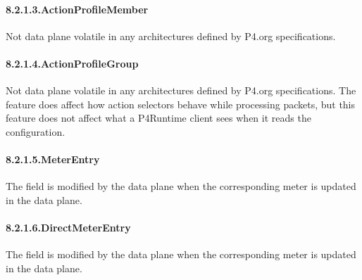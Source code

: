 \documentclass[11pt]{article}
\begin{document}
{%
\paragraph{8.2.1.3.\hspace*{0.5em}ActionProfileMember}\label{sec-actionprofilemember}%

\noindent{}Not data plane volatile in any architectures defined by P4.org
specifications.%

\paragraph{8.2.1.4.\hspace*{0.5em}ActionProfileGroup}\label{sec-actionprofilegroup}%

\noindent{}Not data plane volatile in any architectures defined by P4.org
specifications. The  feature does affect how action
selectors behave while processing packets, but this feature does not
affect what a P4Runtime client sees when it reads the configuration.%

\paragraph{8.2.1.5.\hspace*{0.5em}MeterEntry}\label{sec-meterentry}%

\noindent{}The field  is modified by the data plane when the
corresponding meter is updated in the data plane.%

\paragraph{8.2.1.6.\hspace*{0.5em}DirectMeterEntry}\label{sec-directmeterentry}%

\noindent{}The field  is modified by the data plane when the
corresponding meter is updated in the data plane.%

}
\end{document}

